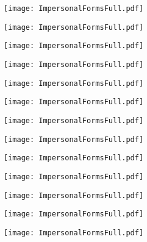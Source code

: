 \documentclass[main.tex]{subfiles}
\begin{document}
\newpage
{}
\label{subsec:impersonal-forms-full-view}

{\parindent25pt\texttt{[image: ImpersonalFormsFull.pdf]}}\newpage

{\parindent25pt\texttt{[image: ImpersonalFormsFull.pdf]}}\newpage

{\parindent25pt\texttt{[image: ImpersonalFormsFull.pdf]}}\newpage

{\parindent25pt\texttt{[image: ImpersonalFormsFull.pdf]}}\newpage

{\parindent25pt\texttt{[image: ImpersonalFormsFull.pdf]}}\newpage

{\parindent25pt\texttt{[image: ImpersonalFormsFull.pdf]}}\newpage

{\parindent25pt\texttt{[image: ImpersonalFormsFull.pdf]}}\newpage

{\parindent25pt\texttt{[image: ImpersonalFormsFull.pdf]}}\newpage

{\parindent25pt\texttt{[image: ImpersonalFormsFull.pdf]}}\newpage

{\parindent25pt\texttt{[image: ImpersonalFormsFull.pdf]}}\newpage

{\parindent25pt\texttt{[image: ImpersonalFormsFull.pdf]}}\newpage

{\parindent25pt\texttt{[image: ImpersonalFormsFull.pdf]}}\newpage

{\parindent25pt\texttt{[image: ImpersonalFormsFull.pdf]}}\newpage
\end{document}
